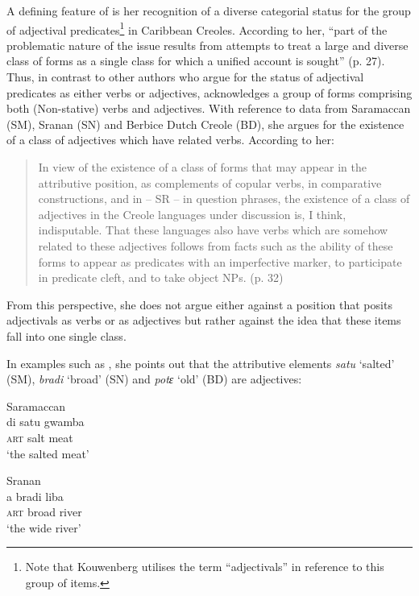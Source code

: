 A defining feature of \citet{Kouwenberg1996} is her recognition of a
diverse categorial status for the group of adjectival predicates\footnote{Note
  that Kouwenberg utilises the term ``adjectivals'' in reference to this
  group of items.}  in Caribbean Creoles.  According to
her, “part of the problematic nature of the issue results from
attempts to treat a large and diverse class of forms as a single class
for which a unified account is sought” (p. 27).  Thus, in contrast to
other authors who argue for the status of adjectival predicates as
either verbs or adjectives, \citet{Kouwenberg1996} acknowledges a
group of forms comprising both (Non-stative) verbs and adjectives.
With reference to data from Saramaccan (SM), Sranan (SN) and Berbice
Dutch Creole (BD), she argues for the existence of a class of
adjectives which have related verbs.  According to her:

\begin{quote}
In view of the existence of a class of forms that may appear in the
attributive position, as complements of copular verbs, in comparative
constructions, and in -- SR -- in question phrases, the existence of a 
class of adjectives in the Creole languages under discussion is, I
think, indisputable.  That these languages also have verbs which are
somehow related to these adjectives follows from facts such as the
ability of these forms to appear as predicates with an imperfective
marker, to participate in predicate cleft, and to take object NPs.
(p. 32)
\end{quote}

From this perspective, she does not argue either against a position
that posits adjectivals as verbs or as adjectives but rather against
the idea that these items fall into one single class.

In examples such as , she points out that the attributive
elements \textit{satu} `salted' (SM), \textit{bradi} `broad' (SN) and
\textit{potɛ} `old' (BD) are adjectives:

\ea%
\label{ex:3:12}
\ea
Saramaccan \\
\gll        di satu gwamba \\
\textsc{art} salt meat  \\
\glt     `the salted meat'

\ex
Sranan\\
\gll        a bradi liba \\
\textsc{art} broad river    \\
\glt      `the wide river'

